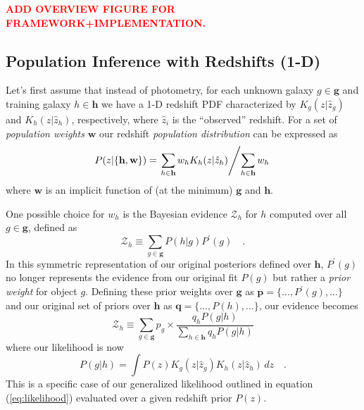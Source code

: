 \documentclass[a4paper,fleqn,usenatbib,english]{mnras}
\newcommand{\josh}[1]{\textcolor{red}{\textbf{#1}}}
\begin{document}
\josh{ADD OVERVIEW FIGURE FOR FRAMEWORK+IMPLEMENTATION.}

\subsection{Population Inference with Redshifts (1-D)}
\label{subsec:ideal}

Let's first assume that instead of photometry, for each unknown galaxy $g \in \mathbf{g}$ and training galaxy $h \in \mathbf{h}$ we have a 1-D redshift PDF characterized by $K_g(z|\hat{z}_g)$ and $K_h(z|\hat{z}_h)$, respectively, where $\hat{z}_i$ is the ``observed'' redshift. For a set of \textit{population weights} $\mathbf{w}$ our redshift \textit{population distribution} can be expressed as 
\begin{equation}\label{eq:pz_pop}
P( z | \lbrace \mathbf{h},\mathbf{w} \rbrace ) = \left. \sum_{h \in \mathbf{h}} w_h K_h(z|\hat{z}_h) \middle/ \sum_{h \in \mathbf{h}} w_h \right.
\end{equation}
where $\mathbf{w}$ is an implicit function of (at the minimum) $\mathbf{g}$ and $\mathbf{h}$.

One possible choice for $w_h$ is the Bayesian evidence $\mathcal{Z}_h$ for $h$ computed over all $g \in \mathbf{g}$, defined as
\begin{equation}
\mathcal{Z}_h \equiv \sum_{g \in \mathbf{g}} P(h|g) P^\prime(g) \quad .
\end{equation}
In this symmetric representation of our original posteriors defined over $\mathbf{h}$, $P^\prime(g)$ no longer represents the evidence from our original fit $P(g)$ but rather a \textit{prior weight} for object $g$. Defining these prior weights over $\mathbf{g}$ as $\mathbf{p}=\lbrace \ldots, P^\prime(g), \ldots \rbrace$ and our original set of priors over $\mathbf{h}$ as $\mathbf{q}=\lbrace \ldots, P(h), \ldots \rbrace$, our evidence becomes
\begin{equation} \label{eq:evidence}
\mathcal{Z}_h \equiv \sum_{g \in \mathbf{g}} p_g \times \frac{q_h P(g|h)}{\sum_{h \in \mathbf{h}} q_h P(g|h)}
\end{equation}
where our likelihood is now
\begin{equation}
P(g|h) = \int P(z) K_g(z|\hat{z}_g) K_h(z|\hat{z}_h) \, dz \quad .
\end{equation}
This is a specific case of our generalized likelihood outlined in equation (\ref{eq:likelihood}) evaluated over a given redshift prior $P(z)$.
\end{document}
